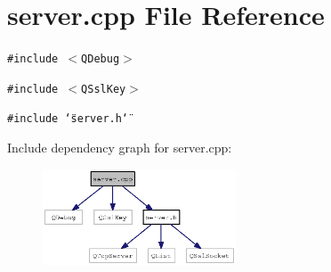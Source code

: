 \section{server.cpp File Reference}
\label{server_8cpp}
{\tt \#include $<$QDebug$>$}\par
{\tt \#include $<$QSslKey$>$}\par
{\tt \#include \char`\"{}server.h\char`\"{}}\par


Include dependency graph for server.cpp:\nopagebreak
\begin{figure}[H]
\begin{center}
\leavevmode
\includegraphics[width=163pt]{server_8cpp__incl}
\end{center}
\end{figure}
